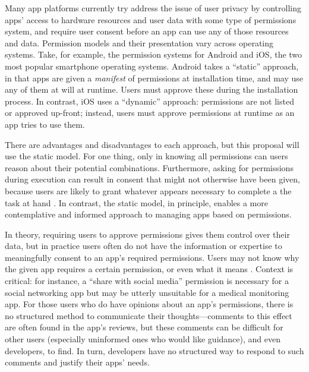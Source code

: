 \documentclass[11pt]{article}
\begin{document}
Many app platforms currently try address the issue of
user privacy by controlling apps' access to hardware resources 
and user data with some type of permissions system,
and require user consent before an app can use any
of those resources and data. Permission models and their presentation 
vary across operating systems. Take, for example, the permission systems
for Android and iOS, the two most popular smartphone operating systems.  
Android takes a ``static'' approach, in that apps are given a
\emph{manifest} of
permissions at installation time, and may use any of them at will at runtime.
Users must approve these during the installation
process. In contrast, iOS uses a ``dynamic''
approach: permissions are not listed or approved up-front; instead, users must
approve permissions at runtime as an app tries to use them.

There are advantages and disadvantages to each approach, but
this proposal will use the static model. For one thing, only in 
knowing all permissions can users reason about their potential
combinations. Furthermore, asking for permissions
during execution can result in consent that might not otherwise
have been given, because users are likely to grant whatever appears
necessary to complete a the task at hand \cite{phisher-wanings-SIGCHI08}. 
In contrast, the static
model, in principle, enables a more contemplative and
informed approach to managing apps based on permissions.

In theory, requiring users to approve permissions gives them control over their 
data, but in practice users often do not have the 
information or expertise to meaningfully consent to an 
app's required permissions. Users may not
know why the given app requires a certain permission, or
even what it means \cite{android-attention-SOUPS12}. 
Context is critical:
for instance, 
a ``share with social media'' permission is necessary for a social
networking app but may be utterly
unsuitable for a medical monitoring app. 
For those users who do have opinions about an app's permissions, 
there is no structured method to
communicate their thoughts---comments to this effect are often found in
the app's reviews, but these comments can be difficult for other
users (especially uninformed ones who would like guidance), and even
developers, to find. In turn, developers have no structured way to
respond to such comments and justify their apps' needs.
\end{document}
